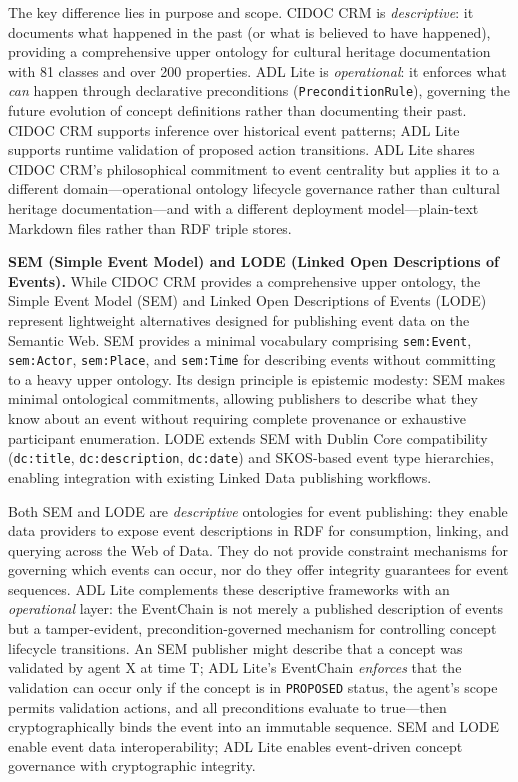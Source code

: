 The key difference lies in purpose and scope. CIDOC CRM is \emph{descriptive}: it documents what happened in the past (or what is believed to have happened), providing a comprehensive upper ontology for cultural heritage documentation with 81 classes and over 200 properties. ADL Lite is \emph{operational}: it enforces what \emph{can} happen through declarative preconditions (\texttt{PreconditionRule}), governing the future evolution of concept definitions rather than documenting their past. CIDOC CRM supports inference over historical event patterns; ADL Lite supports runtime validation of proposed action transitions. ADL Lite shares CIDOC CRM's philosophical commitment to event centrality but applies it to a different domain---operational ontology lifecycle governance rather than cultural heritage documentation---and with a different deployment model---plain-text Markdown files rather than RDF triple stores.

\textbf{SEM (Simple Event Model) and LODE (Linked Open Descriptions of Events).} While CIDOC CRM provides a comprehensive upper ontology, the Simple Event Model (SEM)\cite{ref50} and Linked Open Descriptions of Events (LODE)\cite{ref51} represent lightweight alternatives designed for publishing event data on the Semantic Web. SEM provides a minimal vocabulary comprising \texttt{sem:Event}, \texttt{sem:Actor}, \texttt{sem:Place}, and \texttt{sem:Time} for describing events without committing to a heavy upper ontology. Its design principle is epistemic modesty: SEM makes minimal ontological commitments, allowing publishers to describe what they know about an event without requiring complete provenance or exhaustive participant enumeration. LODE extends SEM with Dublin Core compatibility (\texttt{dc:title}, \texttt{dc:description}, \texttt{dc:date}) and SKOS-based event type hierarchies, enabling integration with existing Linked Data publishing workflows\cite{ref51}.

Both SEM and LODE are \emph{descriptive} ontologies for event publishing: they enable data providers to expose event descriptions in RDF for consumption, linking, and querying across the Web of Data. They do not provide constraint mechanisms for governing which events can occur, nor do they offer integrity guarantees for event sequences. ADL Lite complements these descriptive frameworks with an \emph{operational} layer: the EventChain is not merely a published description of events but a tamper-evident, precondition-governed mechanism for controlling concept lifecycle transitions. An SEM publisher might describe that a concept was validated by agent X at time T; ADL Lite's EventChain \emph{enforces} that the validation can occur only if the concept is in \texttt{PROPOSED} status, the agent's scope permits validation actions, and all preconditions evaluate to true---then cryptographically binds the event into an immutable sequence. SEM and LODE enable event data interoperability; ADL Lite enables event-driven concept governance with cryptographic integrity.

